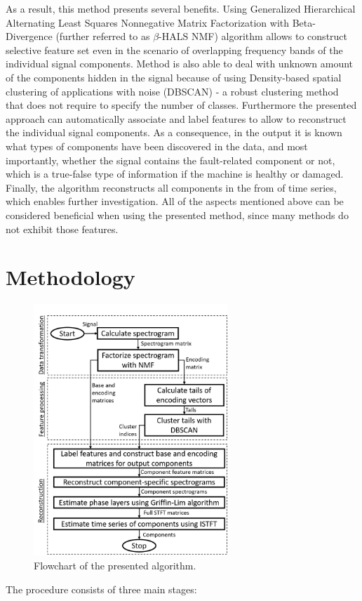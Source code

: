 \documentclass[3p,times]{elsarticle}
\begin{document}
As a result, this method presents several benefits. Using Generalized Hierarchical Alternating Least Squares Nonnegative Matrix Factorization with Beta-Divergence (further referred to as $\beta$-HALS NMF) algorithm allows to construct selective feature set even in the scenario of overlapping frequency bands of the individual signal components. Method is also able to deal with unknown amount of the components hidden in the signal because of using Density-based spatial clustering of applications with noise (DBSCAN) - a robust clustering method that does not require to specify the number of classes. Furthermore the presented approach can automatically associate and label features to allow to reconstruct the individual signal components. As a consequence, in the output it is known what types of components have been discovered in the data, and most importantly, whether the signal contains the fault-related component or not, which is a true-false type of information if the machine is healthy or damaged. Finally, the algorithm reconstructs all components in the from of time series, which enables further investigation. All of the aspects mentioned above can be considered beneficial when using the presented method, since many methods do not exhibit those features.



\section{Methodology}\label{meth} 
\begin{figure}[ht!]
\centering
\includegraphics[width=0.65\textwidth]{figs/block.png}
\caption{Flowchart of the presented algorithm.}
\label{fig:block}
\end{figure}
The procedure consists of three main stages: 
\end{document}
